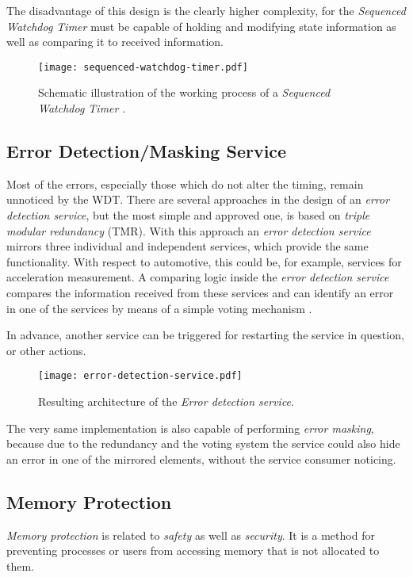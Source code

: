 \begin{description}
The disadvantage of this design is the clearly higher complexity, for the \emph{Sequenced Watchdog Timer} must be capable of holding and modifying state information as well as comparing it to received information.

\begin{figure}[ht]
\centering
\caption{Schematic illustration of the working process of a \emph{Sequenced Watchdog Timer} \cite{elattar2007}.}
\label{fig:sequenced-watchdog-timer}
\texttt{[image: sequenced-watchdog-timer.pdf]}
\end{figure}

\end{description}




\subsection{Error Detection/Masking Service}
\label{sec:error-detection-service}

Most of the errors, especially those which do not alter the timing, remain unnoticed by the WDT. There are several approaches in the design of an \emph{error detection service}, but the most simple and approved one, is based on \emph{triple modular redundancy} (TMR). With this approach an \emph{error detection service} mirrors three individual and independent services, which provide the same functionality. With respect to automotive, this could be, for example, services for acceleration measurement. A comparing logic inside the \emph{error detection service} compares the information received from these services and can identify an error in one of the services by means of a simple voting mechanism \cite{wiki_tmr}.

In advance, another service can be triggered for restarting the service in question, or other actions.

\begin{figure}[ht]
\centering
\texttt{[image: error-detection-service.pdf]}
\caption{Resulting architecture of the \emph{Error detection service}.}
\label{fig:error-detection-service}
\end{figure}

The very same implementation is also capable of performing \emph{error masking}, because due to the redundancy and the voting system the service could also hide an error in one of the mirrored elements, without the service consumer noticing.


\subsection{Memory Protection}
\emph{Memory protection} is related to \emph{safety} as well as \emph{security}. It is a method for preventing processes or users from accessing memory that is not allocated to them.

